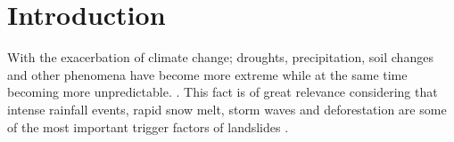 \documentclass[sigconf, nonacm]{acmart}
\begin{document}






\section{Introduction}



With the exacerbation of climate change; droughts, precipitation, soil changes and other phenomena have become more extreme while at the same time becoming more unpredictable. \cite{climatechangeimpacts}. 
This fact is of great relevance considering that intense rainfall events, rapid snow melt, storm waves and deforestation are some of the most important trigger factors of landslides \cite{libro_geologia}.


\end{document}
